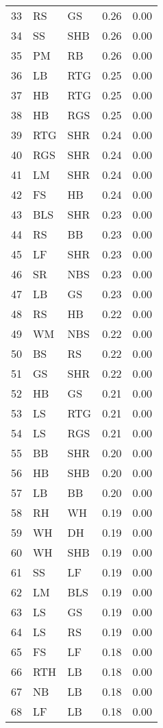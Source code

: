 \begin{table}[ht]
\begin{tabular}{rllrr}
  33 & RS & GS & 0.26 & 0.00 \\ 
  34 & SS & SHB & 0.26 & 0.00 \\ 
  35 & PM & RB & 0.26 & 0.00 \\ 
  36 & LB & RTG & 0.25 & 0.00 \\ 
  37 & HB & RTG & 0.25 & 0.00 \\ 
  38 & HB & RGS & 0.25 & 0.00 \\ 
  39 & RTG & SHR & 0.24 & 0.00 \\ 
  40 & RGS & SHR & 0.24 & 0.00 \\ 
  41 & LM & SHR & 0.24 & 0.00 \\ 
  42 & FS & HB & 0.24 & 0.00 \\ 
  43 & BLS & SHR & 0.23 & 0.00 \\ 
  44 & RS & BB & 0.23 & 0.00 \\ 
  45 & LF & SHR & 0.23 & 0.00 \\ 
  46 & SR & NBS & 0.23 & 0.00 \\ 
  47 & LB & GS & 0.23 & 0.00 \\ 
  48 & RS & HB & 0.22 & 0.00 \\ 
  49 & WM & NBS & 0.22 & 0.00 \\ 
  50 & BS & RS & 0.22 & 0.00 \\ 
  51 & GS & SHR & 0.22 & 0.00 \\ 
  52 & HB & GS & 0.21 & 0.00 \\ 
  53 & LS & RTG & 0.21 & 0.00 \\ 
  54 & LS & RGS & 0.21 & 0.00 \\ 
  55 & BB & SHR & 0.20 & 0.00 \\ 
  56 & HB & SHB & 0.20 & 0.00 \\ 
  57 & LB & BB & 0.20 & 0.00 \\ 
  58 & RH & WH & 0.19 & 0.00 \\ 
  59 & WH & DH & 0.19 & 0.00 \\ 
  60 & WH & SHB & 0.19 & 0.00 \\ 
  61 & SS & LF & 0.19 & 0.00 \\ 
  62 & LM & BLS & 0.19 & 0.00 \\ 
  63 & LS & GS & 0.19 & 0.00 \\ 
  64 & LS & RS & 0.19 & 0.00 \\ 
  65 & FS & LF & 0.18 & 0.00 \\ 
  66 & RTH & LB & 0.18 & 0.00 \\ 
  67 & NB & LB & 0.18 & 0.00 \\ 
  68 & LF & LB & 0.18 & 0.00 \\ 

\end{tabular}
\end{table}
